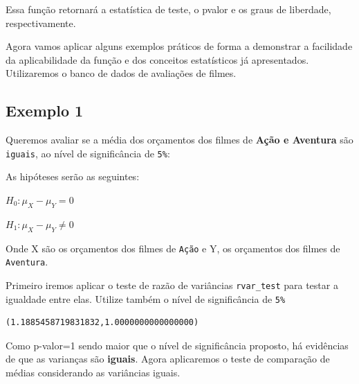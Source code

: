 \documentclass[
  letterpaper,
  DIV=11,
  numbers=noendperiod]{scrreprt}
\newenvironment{Shaded}{\begin{snugshade}}{\end{snugshade}}
\newcommand{\DecValTok}[1]{\textcolor[rgb]{0.68,0.00,0.00}{#1}}
\newcommand{\NormalTok}[1]{\textcolor[rgb]{0.00,0.23,0.31}{#1}}
\newcommand{\OperatorTok}[1]{\textcolor[rgb]{0.37,0.37,0.37}{#1}}
\newcommand{\StringTok}[1]{\textcolor[rgb]{0.13,0.47,0.30}{#1}}
\begin{document}
Essa função retornará a estatística de teste, o pvalor e os graus de
liberdade, respectivamente.

Agora vamos aplicar alguns exemplos práticos de forma a demonstrar a
facilidade da aplicabilidade da função e dos conceitos estatísticos já
apresentados. Utilizaremos o banco de dados de avaliações de filmes.

\hypertarget{exemplo-1-4}{%
\subsection{Exemplo 1}\label{exemplo-1-4}}

Queremos avaliar se a média dos orçamentos dos filmes de \textbf{Ação e
Aventura} são \texttt{iguais}, ao nível de significância de
\texttt{5\%}:

As hipóteses serão as seguintes:

\(H_{0} : \mu_{X} - \mu_{Y} = 0\)

\(H_{1} : \mu_{X} - \mu_{Y}\neq 0\)

Onde X são os orçamentos dos filmes de \texttt{Ação} e Y, os orçamentos
dos filmes de \texttt{Aventura}.

Primeiro iremos aplicar o teste de razão de variâncias
\texttt{rvar\_test} para testar a igualdade entre elas. Utilize também o
nível de significância de \texttt{5\%}

\begin{Shaded}
\end{Shaded}

\begin{tcolorbox}[enhanced jigsaw, breakable, leftrule=.75mm, left=2mm, opacityback=0, bottomrule=.15mm, toprule=.15mm, rightrule=.15mm, arc=.35mm, colback=white]

\begin{verbatim}
(1.1885458719831832,1.0000000000000000)
\end{verbatim}

\end{tcolorbox}

Como p-valor=1 sendo maior que o nível de significância proposto, há
evidências de que as varianças são \textbf{iguais}. Agora aplicaremos o
teste de comparação de médias considerando as variâncias iguais.
\end{document}
